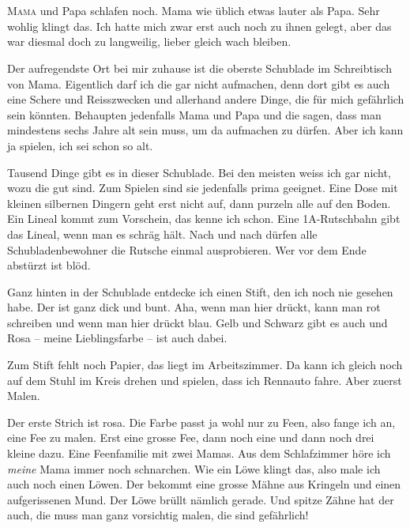 \chapter*{}
\lettrine[lines=3]{\color{DeepPink}M}{ama} und Papa schlafen noch. Mama wie üblich etwas lauter als Papa.  Sehr wohlig klingt das. Ich hatte mich zwar erst auch noch zu ihnen gelegt, aber das war diesmal doch zu langweilig, lieber gleich wach bleiben. 

Der aufregendste Ort bei mir zuhause ist die oberste Schublade im Schreibtisch von Mama. Eigentlich darf ich die gar nicht aufmachen, denn dort gibt es auch eine Schere und Reisszwecken und allerhand andere Dinge, die für mich gefährlich sein könnten. Behaupten jedenfalls Mama und Papa und die sagen, dass man mindestens sechs Jahre alt sein muss, um da aufmachen zu dürfen. Aber ich kann ja spielen, ich sei schon so alt. 

Tausend Dinge gibt es in dieser Schublade. Bei den meisten weiss ich gar nicht, wozu die gut sind. Zum Spielen sind sie jedenfalls prima geeignet. Eine Dose mit kleinen silbernen Dingern geht erst nicht auf, dann purzeln alle auf den Boden. Ein Lineal kommt zum Vorschein, das kenne ich schon. Eine 1A-Rutschbahn gibt das Lineal, wenn man es schräg hält. Nach und nach dürfen alle Schubladenbewohner die Rutsche einmal ausprobieren. Wer vor dem Ende abstürzt ist blöd. 

Ganz hinten in der Schublade entdecke ich einen Stift, den ich noch nie gesehen habe. Der ist ganz dick und bunt. Aha, wenn man hier drückt, kann man rot schreiben und wenn man hier drückt blau. Gelb und Schwarz gibt es auch und Rosa -- meine Lieblingsfarbe -- ist auch dabei.

Zum Stift fehlt noch Papier, das liegt im Arbeitszimmer. Da kann ich gleich noch auf dem Stuhl im Kreis drehen und spielen, dass ich Rennauto fahre. Aber zuerst Malen. 

Der erste Strich ist rosa. Die Farbe passt ja wohl nur zu Feen, also fange ich an, eine Fee zu malen. Erst eine grosse Fee, dann noch eine und dann noch drei kleine dazu. Eine Feenfamilie mit zwei Mamas. Aus dem Schlafzimmer höre ich \emph{meine} Mama immer noch schnarchen. Wie ein Löwe klingt das, also male ich auch noch einen Löwen. Der bekommt eine grosse Mähne aus Kringeln und einen aufgerissenen Mund. Der Löwe brüllt nämlich gerade. Und spitze Zähne hat der auch, die muss man ganz vorsichtig malen, die sind gefährlich!


